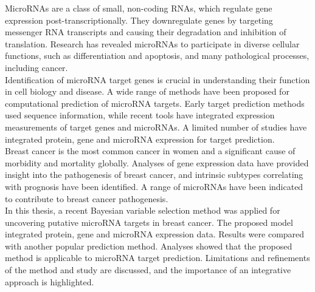 \documentclass[english,12pt,a4paper,pdftex,elec,utf8]{aaltothesis}
\begin{document}
\begin{abstractpage}[english]

MicroRNAs are a class of small, non-coding RNAs, which regulate gene
expression post-transcriptionally. They downregulate genes by targeting
messenger RNA transcripts and causing their degradation and inhibition of
translation. Research has revealed microRNAs to participate in diverse
cellular functions, such as differentiation and apoptosis, and many
pathological processes, including cancer. \\

Identification of microRNA target genes is crucial in understanding their
function in cell biology and disease. A wide range of methods have been
proposed for computational prediction of microRNA targets. Early target
prediction methods used sequence information, while recent tools have
integrated expression measurements of target genes and microRNAs. A limited
number of studies have integrated protein, gene and microRNA
expression for target prediction. \\

Breast cancer is the most common cancer in women and a significant cause of
morbidity and mortality globally. Analyses of gene expression data have
provided insight into the pathogenesis of breast cancer, and intrinsic
subtypes correlating with prognosis have been identified. A range of microRNAs
have been indicated to contribute to breast cancer pathogenesis. \\

In this thesis, a
recent Bayesian variable selection method was applied for uncovering putative
microRNA targets in breast cancer. The proposed model integrated
protein, gene and microRNA expression data. Results
were compared with another popular prediction method.
Analyses showed that the proposed method is applicable to microRNA target
prediction. Limitations and refinements of the method and study are discussed,
and the importance of an integrative approach is highlighted.

\end{abstractpage}
\end{document}
